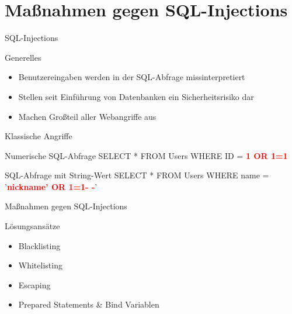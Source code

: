\section{Maßnahmen gegen SQL-Injections}

\begin{frame}{SQL-Injections}
\begin{block}{Generelles}
\begin{itemize}[<+->]
	\item Benutzereingaben werden in der SQL-Abfrage missinterpretiert
	\item Stellen seit Einführung von Datenbanken ein Sicherheitsrisiko dar
	\item Machen Großteil aller Webangriffe aus
\end{itemize}
\end{block}
\end{frame}

\begin{frame}{Klassische Angriffe}
\begin{block}{Numerische SQL-Abfrage}
	SELECT * FROM Users WHERE ID = \textcolor{red}{\textbf{1 OR 1=1}}
\end{block}
\begin{block}{SQL-Abfrage mit String-Wert}
	SELECT * FROM Users WHERE name = '{}\textcolor{red}{\textbf{nickname'{} OR 1=1- -}}'{}
\end{block}
\end{frame}


\begin{frame}{Maßnahmen gegen SQL-Injections}
\begin{block}{Lösungsansätze}
\begin{itemize}[<+->]
\item Blacklisting 
\item Whitelisting
\item Escaping
\item Prepared Statements \& Bind Variablen
\end{itemize}
\end{block}
\end{frame}

